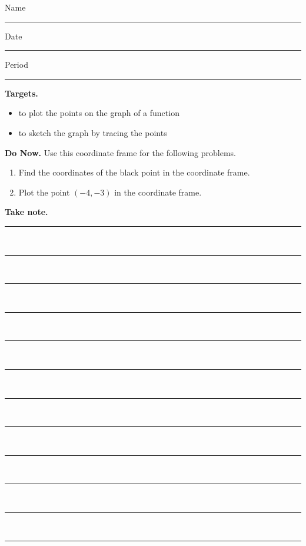 \documentclass[10pt]{article}
\title{}
\date{}
\begin{document}
\noindent
{
Name \rule{16em}{.5pt} Date \rule{8em}{.5pt} Period \rule{4em}{.5pt}
}
\vspace{1em}

{\noindent\bf Targets.}
\begin{itemize}
    \item to plot the points on the graph of a function
    \item to sketch the graph by tracing the points
\end{itemize}
{\noindent\bf Do Now.}
Use this coordinate frame for the following problems. 
\begin{center}
\end{center}   
\begin{enumerate}
    \item Find the coordinates of the black point in the coordinate frame.
    \item Plot the point \((-4, -3)\) in the coordinate frame.
\end{enumerate}

{\noindent\bf Take note.}\\[1em]

\noindent
\rule{\textwidth}{.5pt}\\[1em]
\rule{\textwidth}{.5pt}\\[1em]
\rule{\textwidth}{.5pt}\\[1em]
\rule{\textwidth}{.5pt}\\[1em]
\rule{\textwidth}{.5pt}\\[1em]
\rule{\textwidth}{.5pt}\\[1em]
\rule{\textwidth}{.5pt}\\[1em]
\rule{\textwidth}{.5pt}\\[1em]
\rule{\textwidth}{.5pt}\\[1em]
\rule{\textwidth}{.5pt}\\[1em]
\rule{\textwidth}{.5pt}\\[1em]
\rule{\textwidth}{.5pt}
\clearpage
\end{document}
